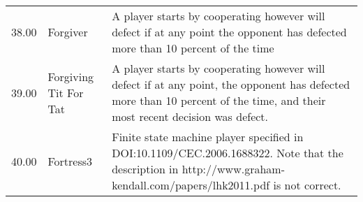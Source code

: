 \begin{tabular}{rll}
	38.00  & Forgiver                    & A player starts by cooperating however will defect if at any point
	the opponent has defected more than 10 percent of the time                                                                                                                                                                                                                                                                                                                                                                                                                                                                                                                                                                                                                                                                                                                                                                                                                                                                                        \\
	39.00  & Forgiving Tit For Tat       & A player starts by cooperating however will defect if at any point,
	the opponent has defected more than 10 percent of the time,
	and their most recent decision was defect.                                                                                                                                                                                                                                                                                                                                                                                                                                                                                                                                                                                                                                                                                                                                                                                                                                       \\
	40.00  & Fortress3                   & Finite state machine player specified in DOI:10.1109/CEC.2006.1688322.
	Note that the description in http://www.graham-kendall.com/papers/lhk2011.pdf
	is not correct.                                                                                                                                                                                                                                                                                                                                                                                                                                                                                                                                                                                                                                                                                                                                                                                                                                             \\

\end{tabular}

